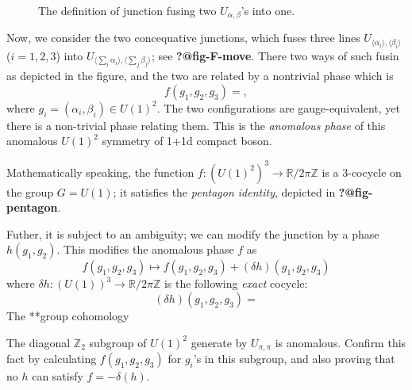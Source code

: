 \documentclass[
  letterpaper,
  DIV=11,
  numbers=noendperiod]{scrreport}
\begin{document}
\begin{figure}
\begin{minipage}[t]{0.65\linewidth}
{{}

}

\end{minipage}%

\caption{\label{fig-junction-def}The definition of junction fusing two
\(U_{\alpha,\beta}\)'s into one.}

\end{figure}

Now, we consider the two concequative junctions, which fuses three lines
\(U_{\langle\alpha_i\rangle,\langle\beta_i\rangle}\) (\(i=1,2,3\)) into
\(U_{\langle\sum_i \alpha_i\rangle,\langle\sum_j \beta_j \rangle}\); see
\textbf{?@fig-F-move}. There two ways of such fusin as depicted in the
figure, and the two are related by a nontrivial phase which is \[
f(g_1,g_2,g_3) = ,
\] where \(g_i = (\alpha_i,\beta_i)\in U(1)^2\). The two configurations
are gauge-equivalent, yet there is a non-trivial phase relating them.
This is the \emph{anomalous phase} of this anomalous \(U(1)^2\) symmetry
of 1+1d compact boson.

\begin{tcolorbox}[enhanced jigsaw, colbacktitle=quarto-callout-note-color!10!white, leftrule=.75mm, bottomrule=.15mm, opacityback=0, toptitle=1mm, title=\textcolor{quarto-callout-note-color}{\faInfo}\hspace{0.5em}{\textsf{Group Cocycle}}, colback=white, toprule=.15mm, breakable, opacitybacktitle=0.6, coltitle=black, bottomtitle=1mm, titlerule=0mm, arc=.35mm, rightrule=.15mm, colframe=quarto-callout-note-color-frame, left=2mm]

Mathematically speaking, the function
\(f : (U(1)^2)^3 \to \mathbb{R}/2\pi\mathbb{Z}\) is a 3-cocycle on the
group \(G=U(1)\); it satisfies the \emph{pentagon identity}, depicted in
\textbf{?@fig-pentagon}.

Futher, it is subject to an ambiguity; we can modify the junction by a
phase \(h(g_1,g_2)\). This modifies the anomalous phase \(f\) as
\[ f(g_1,g_2,g_3) \mapsto f(g_1,g_2,g_3) + (\delta h)(g_1,g_2,g_3)
\] where \(\delta h : (U(1))^3\to \mathbb{R}/2\pi\mathbb{Z}\) is the
following \emph{exact} cocycle: \[
(\delta h)(g_1,g_2,g_3) = 
\] The **group cohomology

\end{tcolorbox}

\begin{tcolorbox}[enhanced jigsaw, colbacktitle=quarto-callout-tip-color!10!white, leftrule=.75mm, bottomrule=.15mm, opacityback=0, toptitle=1mm, title=\textcolor{quarto-callout-tip-color}{\faLightbulb}\hspace{0.5em}{\textsf{Exercise: \(\mathbb{Z}_2\) anomaly}}, colback=white, toprule=.15mm, breakable, opacitybacktitle=0.6, coltitle=black, bottomtitle=1mm, titlerule=0mm, arc=.35mm, rightrule=.15mm, colframe=quarto-callout-tip-color-frame, left=2mm]

The diagonal \(\mathbb{Z}_2\) subgroup of \(U(1)^2\) generate by
\(U_{\pi,\pi}\) is anomalous. Confirm this fact by calculating
\(f(g_1,g_2,g_3)\) for \(g_i\)'s in this subgroup, and also proving that
no \(h\) can satisfy \(f = -\delta(h)\).

\end{tcolorbox}
\end{document}
